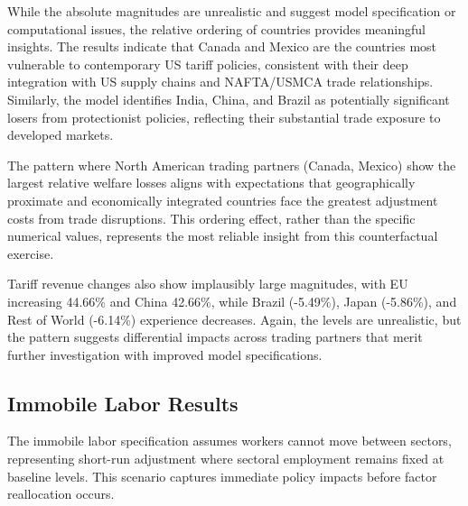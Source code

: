 While the absolute magnitudes are unrealistic and suggest model specification or computational issues, the relative ordering of countries provides meaningful insights. The results indicate that Canada and Mexico are the countries most vulnerable to contemporary US tariff policies, consistent with their deep integration with US supply chains and NAFTA/USMCA trade relationships. Similarly, the model identifies India, China, and Brazil as potentially significant losers from protectionist policies, reflecting their substantial trade exposure to developed markets.

\begin{landscape}
    \vspace*{\fill}
    
    \vspace*{\fill}
\end{landscape}
The pattern where North American trading partners (Canada, Mexico) show the largest relative welfare losses aligns with expectations that geographically proximate and economically integrated countries face the greatest adjustment costs from trade disruptions. This ordering effect, rather than the specific numerical values, represents the most reliable insight from this counterfactual exercise.

Tariff revenue changes also show implausibly large magnitudes, with EU increasing 44.66\% and China 42.66\%, while Brazil (-5.49\%), Japan (-5.86\%), and Rest of World (-6.14\%) experience decreases. Again, the levels are unrealistic, but the pattern suggests differential impacts across trading partners that merit further investigation with improved model specifications.

\begin{landscape}
    \vspace*{\fill}
    
    \vspace*{\fill}
\end{landscape}
\subsection{Immobile Labor Results}

The immobile labor specification assumes workers cannot move between sectors, representing short-run adjustment where sectoral employment remains fixed at baseline levels. This scenario captures immediate policy impacts before factor reallocation occurs.

